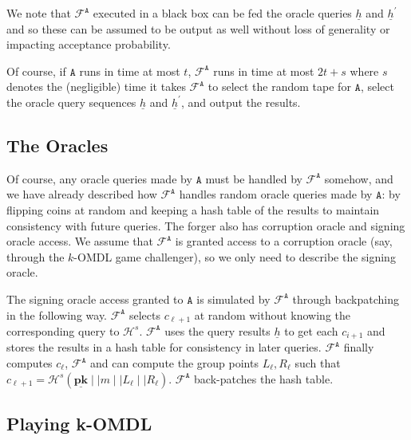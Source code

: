 \documentclass{article}
\theoremstyle{plain}
\theoremstyle{definition}
\begin{document}
We note that $\mathcal{F}^{\texttt{A}}$ executed in a black box can be fed the oracle queries $\underline{h}$ and $\underline{h}^\prime$ and so these can be assumed to be output as well without loss of generality or impacting acceptance probability.


Of course, if $\texttt{A}$ runs in time at most $t$, $\mathcal{F}^{\texttt{A}}$ runs in time at most $2t+s$ where $s$ denotes the (negligible) time it takes $\mathcal{F}^{\texttt{A}}$ to select the random tape for $\texttt{A}$, select the oracle query sequences $\underline{h}$ and $\underline{h}^\prime$, and output the results. 

\subsection{The Oracles}

Of course, any oracle queries made by $\texttt{A}$ must be handled by $\mathcal{F}^{\texttt{A}}$ somehow, and we have already described how $\mathcal{F}^{\texttt{A}}$ handles random oracle queries made by $\texttt{A}$: by flipping coins at random and keeping a hash table of the results to maintain consistency with future queries. The forger also has corruption oracle and signing oracle access. We assume that $\mathcal{F}^{\texttt{A}}$ is granted access to a corruption oracle (say, through the $k$-OMDL game challenger), so we only need to describe the signing oracle. 


The signing oracle access granted to $\texttt{A}$ is simulated by $\mathcal{F}^{\texttt{A}}$ through backpatching in the following way. $\mathcal{F}^{\texttt{A}}$ selects $c_{\ell+1}$ at random without knowing the corresponding query to $\mathcal{H}^s$. $\mathcal{F}^{\texttt{A}}$ uses the query results $\underline{h}$ to get each $c_{i+1}$ and stores the results in a hash table for consistency in later queries. $\mathcal{F}^{\texttt{A}}$ finally computes $c_\ell$, $\mathcal{F}^{\texttt{A}}$ and can compute the group points $L_\ell, R_\ell$ such that $c_{\ell+1} = \mathcal{H}^s(\underline{\textbf{pk}} \mid \mid m \mid \mid L_\ell \mid \mid R_\ell)$. $\mathcal{F}^{\texttt{A}}$ back-patches the hash table.


\subsection{Playing k-OMDL}
\end{document}
